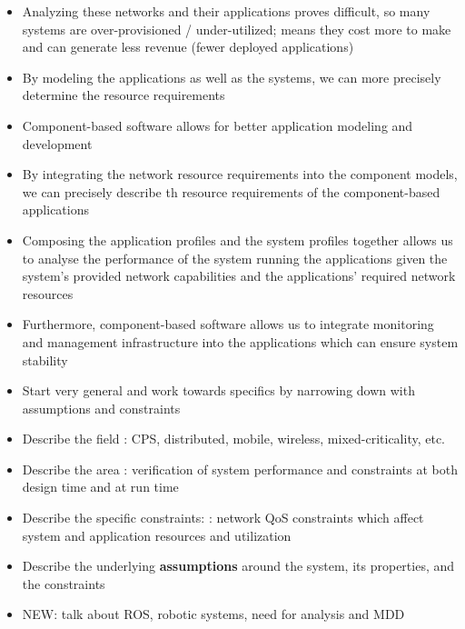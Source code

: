 \begin{itemize}
	\item Analyzing these networks and their applications proves difficult, so many systems are over-provisioned / under-utilized; means they cost more to make and can generate less revenue (fewer deployed applications)
	\item By modeling the applications as well as the systems, we can more precisely determine the resource requirements 
	\item Component-based software allows for better application modeling and development
	\item By integrating the network resource requirements into the component models, we can precisely describe th resource requirements of the component-based applications
	\item Composing the application profiles and the system profiles together allows us to analyse the performance of the system running the applications given the system's provided network capabilities and the applications' required network resources
	\item Furthermore, component-based software allows us to integrate monitoring and management infrastructure into the applications which can ensure system stability
\end{itemize}


\begin{itemize}
	\item Start very general and work towards specifics by narrowing down with assumptions and constraints
	\item Describe the field : CPS, distributed, mobile, wireless, mixed-criticality, etc.
	\item Describe the area : verification of system performance and constraints at both design time and at run time
	\item Describe the specific constraints: : network QoS constraints which affect system and application resources and utilization
	\item Describe the underlying \textbf{assumptions} around the system, its properties, and the constraints
	\item NEW: talk about ROS, robotic systems, need for analysis and MDD
\end{itemize}
\fi

